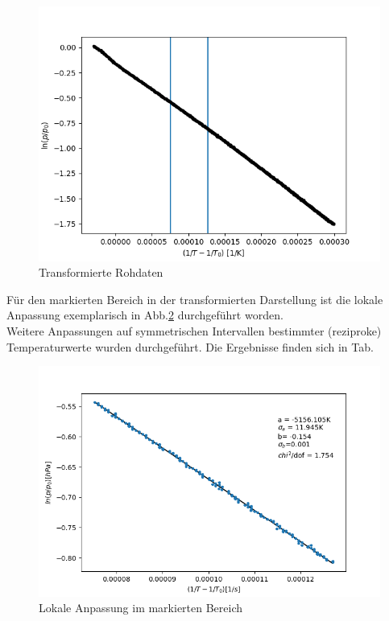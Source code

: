 \documentclass[12pt,a4paper]{article}
\begin{document}
\begin{figure}
\begin{center}
\includegraphics[scale=0.8]{Bilder/log_RohdatenB}
\caption[Rohdaten logarith. B]{Transformierte Rohdaten}
\label{fig:logB}
\end{center}
\end{figure}

Für den markierten Bereich in der transformierten Darstellung ist die lokale Anpassung exemplarisch in Abb.\ref{fig:fit_2B} durchgeführt worden.\\
Weitere Anpassungen auf symmetrischen Intervallen bestimmter (reziproke) Temperaturwerte wurden durchgeführt. Die Ergebnisse finden sich in Tab. %

\begin{figure}
\begin{center}
\includegraphics[scale=0.8]{Bilder/lokaler_fit_2B}
\caption[Lokale Anpassung]{Lokale Anpassung im markierten Bereich}
\label{fig:fit_2B}
\end{center}
\end{figure}
\end{document}
